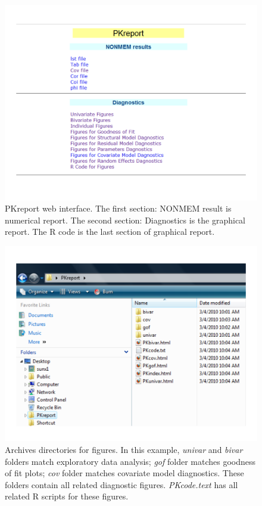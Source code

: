 \documentclass[a4paper]{article}
\begin{document}
\begin{figure}[h!tb] \centering
\includegraphics[scale=0.5]{c2_s2_2web.pdf}
\caption{PKreport web interface. The first section: NONMEM result is numerical report. 
The second section: Diagnostics is the graphical report. The R code is
the last section of graphical report.}
\label{c2_s2_2web}
\end{figure}


\begin{figure}[h!tb] \centering
\includegraphics[scale=0.5]{c2_s2_4dir.pdf}
\caption{Archives directories for figures. In this example, \textit{univar} and \textit{bivar} folders match exploratory data analysis; \textit{gof} folder matches goodness of fit plots; \textit{cov} folder matches covariate model diagnostics. These folders contain all related diagnostic figures. \textit{PKcode.text} has all related R scripts for these figures.}
\label{c2_s2_4dir}
\end{figure}
\end{document}
